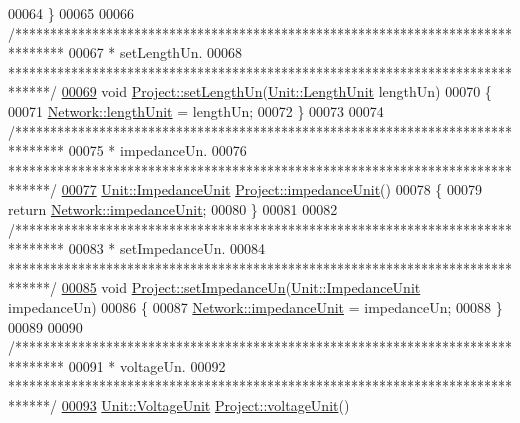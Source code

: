 \begin{DoxyCode}
00064 \}
00065 
00066 \textcolor{comment}{/*******************************************************************************}
00067 \textcolor{comment}{ * setLengthUn.}
00068 \textcolor{comment}{ ******************************************************************************/}
\hypertarget{project_8cpp_source_l00069}{}\hyperlink{class_project_a846ee2284b0856d461b35d78d9f8e1d6}{00069} \textcolor{keywordtype}{void} \hyperlink{class_project_a846ee2284b0856d461b35d78d9f8e1d6}{Project::setLengthUn}(\hyperlink{class_unit_a8c8921f7b225ad6063b1cb573425b9a0}{Unit::LengthUnit} lengthUn)
00070 \{
00071   \hyperlink{group___models_gae46c0e2bf39b343875e3c69066fe2652}{Network::lengthUnit} = lengthUn;
00072 \}
00073 
00074 \textcolor{comment}{/*******************************************************************************}
00075 \textcolor{comment}{ * impedanceUn.}
00076 \textcolor{comment}{ ******************************************************************************/}
\hypertarget{project_8cpp_source_l00077}{}\hyperlink{class_project_ad0725b9aa4445dd6d21d4e15df482d3b}{00077} \hyperlink{class_unit_a3747e779c805df24a71961290be3fbdf}{Unit::ImpedanceUnit} \hyperlink{class_project_ad0725b9aa4445dd6d21d4e15df482d3b}{Project::impedanceUnit}()
00078 \{
00079   \textcolor{keywordflow}{return} \hyperlink{group___models_ga5f3d72699a723c64a89d22e34df708ff}{Network::impedanceUnit};
00080 \}
00081 
00082 \textcolor{comment}{/*******************************************************************************}
00083 \textcolor{comment}{ * setImpedanceUn.}
00084 \textcolor{comment}{ ******************************************************************************/}
\hypertarget{project_8cpp_source_l00085}{}\hyperlink{class_project_a995d050781923522ae2a02728346d199}{00085} \textcolor{keywordtype}{void} \hyperlink{class_project_a995d050781923522ae2a02728346d199}{Project::setImpedanceUn}(\hyperlink{class_unit_a3747e779c805df24a71961290be3fbdf}{Unit::ImpedanceUnit} impedanceUn)
00086 \{
00087   \hyperlink{group___models_ga5f3d72699a723c64a89d22e34df708ff}{Network::impedanceUnit} = impedanceUn;
00088 \}
00089 
00090 \textcolor{comment}{/*******************************************************************************}
00091 \textcolor{comment}{ * voltageUn.}
00092 \textcolor{comment}{ ******************************************************************************/}
\hypertarget{project_8cpp_source_l00093}{}\hyperlink{class_project_a93b928093072ba15c24693b03a934e4e}{00093} \hyperlink{class_unit_a55b07dfa9457e1eca2c7194fe0cfc3c1}{Unit::VoltageUnit} \hyperlink{class_project_a93b928093072ba15c24693b03a934e4e}{Project::voltageUnit}()

\end{DoxyCode}
